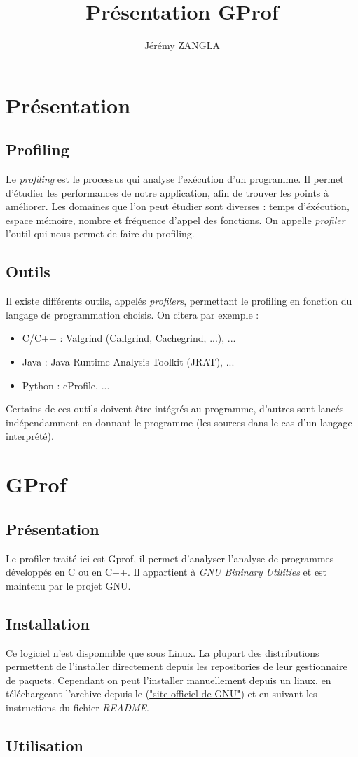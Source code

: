 \documentclass[a4paper]{article}
\title{Présentation GProf}
\author{Jérémy ZANGLA}
\begin{document}
\maketitle
\pagebreak
\tableofcontents
\pagebreak
\section{Présentation}
\subsection{Profiling}
Le \emph{profiling} est le processus qui analyse l'exécution d'un programme.
Il permet d'étudier les performances de notre application, afin de trouver les points à améliorer.
Les domaines que l'on peut étudier sont diverses : temps d'éxécution, espace mémoire, nombre et fréquence d'appel des fonctions.
On appelle \emph{profiler} l'outil qui nous permet de faire du profiling.
\subsection{Outils}
Il existe différents outils, appelés \emph{profilers}, permettant le profiling en fonction du langage de programmation choisis. On citera par exemple : 
\begin{itemize}
    \item C/C++ : Valgrind (Callgrind, Cachegrind, ...), ...
    \item Java : Java Runtime Analysis Toolkit (JRAT), ...
    \item Python : cProfile, ...
\end{itemize}
Certains de ces outils doivent être intégrés au programme, d'autres sont lancés indépendamment en donnant le programme (les sources dans le cas d'un langage interprété).
\section{GProf}
\subsection{Présentation}Le profiler traité ici est Gprof, il permet d'analyser l'analyse de programmes développés en C ou en C++.
Il appartient à \emph{GNU Bininary Utilities} et est maintenu par le projet GNU.
\subsection{Installation}
Ce logiciel n'est disponnible que sous Linux. La plupart des distributions permettent de l'installer directement depuis les repositories de leur gestionnaire de paquets. 
Cependant on peut l'installer manuellement depuis un linux, en téléchargeant l'archive depuis le (\href{http://ftpmirror.gnu.org/binutils}{"site officiel de GNU"}) et en suivant les instructions du fichier \emph{README}.
\subsection{Utilisation}
\end{document}
